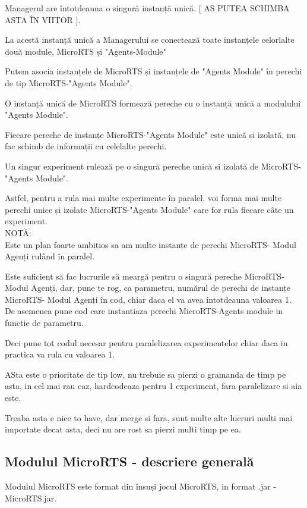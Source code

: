 \documentclass{article}
\begin{document}
Managerul are întotdeauna o singură instanță unică. [ AS PUTEA SCHIMBA ASTA ÎN VIITOR ].

La acestă instanță unică a Managerului se conectează toate instanțele celorlalte două module, MicroRTS și "Agents-Module"


Putem asocia instanțele de MicroRTS și instanțele de "Agents Module" în perechi de tip MicroRTS-"Agents Module".

O instanță unică de MicroRTS formează pereche cu o instanță unică a modulului "Agents Module".

Fiecare pereche de instanțe MicroRTS-"Agents Module" este unică și izolată, nu fac schimb de informații cu celelalte perechi.

Un singur experiment rulează pe o singură pereche unică si izolată de MicroRTS-"Agents Module".

Astfel, pentru a rula mai multe experimente în paralel, voi forma mai multe perechi unice și izolate MicroRTS-"Agents Module" care for rula fiecare câte un experiment.\\

NOTĂ:\\

Este un plan foarte ambițios sa am multe instanțe de perechi MicroRTS- Modul Agenți rulând în paralel.

Este suficient să fac lucrurile să meargă pentru o singură pereche MicroRTS-Modul Agenți, dar, pune te rog, ca parametru, numărul de perechi de instanțe MicroRTS- Modul Agenți în cod, chiar daca el va avea întotdeauna valoarea 1. De asemenea pune cod care instantiaza perechi MicroRTS-Agents module in functie de parametru.

Deci pune tot codul necesar pentru paralelizarea experimentelor chiar daca in practica va rula cu valoarea 1.

ASta este o prioritate de tip low, nu trebuie sa pierzi o gramanda de timp pe asta, in cel mai rau caz, hardcodeaza pentru 1 experiment, fara paralelizare si aia este.

Treaba asta e nice to have, dar merge si fara, sunt multe alte lucruri multi mai importate decat asta, deci nu are rost sa pierzi multi timp pe ea.

\subsection{Modulul MicroRTS - descriere generală}
Modulul MicroRTS este format din însuși jocul MicroRTS, in format .jar - MicroRTS.jar.
\end{document}
